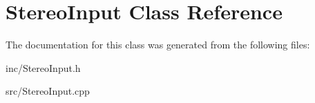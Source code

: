 \hypertarget{class_stereo_input}{}\section{Stereo\+Input Class Reference}
\label{class_stereo_input}


The documentation for this class was generated from the following files\+:\begin{DoxyCompactItemize}
\item 
inc/Stereo\+Input.\+h\item 
src/Stereo\+Input.\+cpp\end{DoxyCompactItemize}
